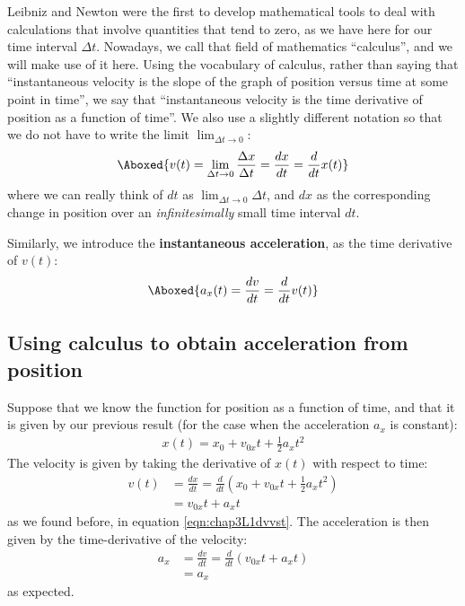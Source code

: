 Leibniz and Newton were the first to develop mathematical tools to deal with calculations that involve quantities that tend to zero, as we have here for our time interval $\Delta t$. Nowadays, we call that field of mathematics ``calculus'', and we will make use of it here. Using the vocabulary of calculus, rather than saying that ``instantaneous velocity is the slope of the graph of position versus time at some point in time'', we say that ``instantaneous velocity is the time derivative of position as a function of time''. We also use a slightly different notation so that we do not have to write the limit $\lim_{\Delta t\to 0}$:
\begin{align}
\label{eqn:chap3:vdef}
\Aboxed{v(t)=\lim_{\Delta t\to 0} \frac{\Delta x}{\Delta t}=\frac{dx}{dt}=\frac{d}{dt} x(t)}
\end{align}
where we can really think of $dt$ as $\lim_{\Delta t\to 0}\Delta t$, and $dx$ as the corresponding change in position over an \textit{infinitesimally} small time interval $dt$.

Similarly, we introduce the \textbf{instantaneous acceleration}, as the time derivative of $v(t)$:
\begin{align}
\Aboxed{a_x(t)=\frac{dv}{dt}=\frac{d}{dt}v(t)}
\end{align}


\subsection{Using calculus to obtain acceleration from position}
Suppose that we know the function for position as a function of time, and that it is given by our previous result (for the case when the acceleration $a_x$ is constant):
\begin{align*}
x(t)=x_0+v_{0x}t+\frac{1}{2}a_xt^2
\end{align*}
The velocity is given by taking the derivative of $x(t)$ with respect to time:
\begin{align*}
v(t)&=\frac{dx}{dt}=\frac{d}{dt}\left(x_0+v_{0x}t+\frac{1}{2}a_xt^2\right)\\
&=v_{0x}t+a_xt
\end{align*}
as we found before, in equation \ref{eqn:chap3L1dvvst}. The acceleration is then given by the time-derivative of the velocity:
\begin{align*}
a_x &= \frac{dv}{dt}=\frac{d}{dt}\left(v_{0x}t+a_xt\right)\\
&=a_x
\end{align*}
as expected.


